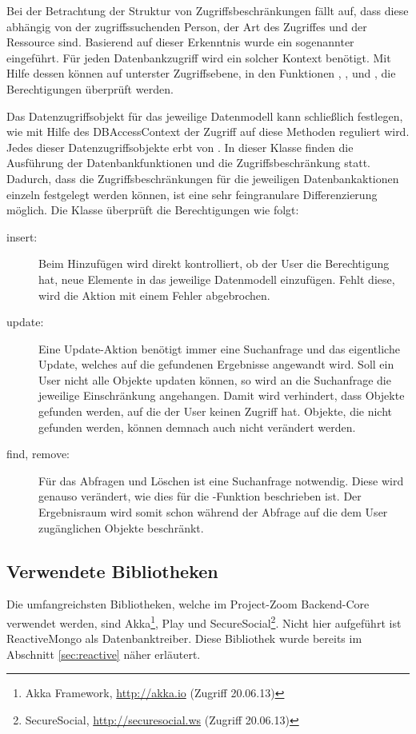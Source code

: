 Bei der Betrachtung der Struktur von Zugriffsbeschränkungen fällt auf, dass diese abhängig von der zugriffssuchenden Person, der Art des Zugriffes und der \gls{Ressource} sind. Basierend auf dieser Erkenntnis wurde ein sogenannter  eingeführt. Für jeden Datenbankzugriff wird ein solcher Kontext benötigt. Mit Hilfe dessen können auf unterster Zugriffsebene, in den Funktionen , ,  und , die Berechtigungen überprüft werden.

Das Datenzugriffsobjekt für das jeweilige Datenmodell kann schließlich festlegen, wie mit Hilfe des DBAccessContext der Zugriff auf diese Methoden reguliert wird. Jedes dieser Datenzugriffsobjekte erbt von . In dieser Klasse finden die Ausführung der Datenbankfunktionen und die Zugriffsbeschränkung statt. Dadurch, dass die Zugriffsbeschränkungen für die jeweiligen Datenbankaktionen einzeln festgelegt werden können, ist eine sehr feingranulare Differenzierung möglich.
\newpage
Die Klasse  überprüft die Berechtigungen wie folgt:
\begin{description}
\item[insert:] Beim Hinzufügen wird direkt kontrolliert, ob der User die Berechtigung hat, neue Elemente in das jeweilige Datenmodell einzufügen. Fehlt diese, wird die Aktion mit einem Fehler abgebrochen.
\item[update:] Eine Update-Aktion benötigt immer eine Suchanfrage und das eigentliche Update, welches auf die gefundenen Ergebnisse angewandt wird. Soll ein User nicht alle Objekte updaten können, so wird an die Suchanfrage die jeweilige Einschränkung angehangen. Damit wird verhindert, dass Objekte gefunden werden, auf die der User keinen Zugriff hat. Objekte, die nicht gefunden werden, können demnach auch nicht verändert werden.
\item[find, remove:] Für das Abfragen und Löschen ist eine Suchanfrage notwendig. Diese wird genauso verändert, wie dies für die -Funktion beschrieben ist. Der Ergebnisraum wird somit schon während der Abfrage auf die dem User zugänglichen Objekte beschränkt.
\end{description}

\subsection{Verwendete Bibliotheken}
Die umfangreichsten Bibliotheken, welche im Project-Zoom \gls{Backend}-Core verwendet werden, sind Akka\footnote{Akka \gls{Framework}, \url{http://akka.io} (Zugriff 20.06.13)}, Play und SecureSocial\footnote{SecureSocial, \url{http://securesocial.ws} (Zugriff 20.06.13)}. Nicht hier aufgeführt ist ReactiveMongo als Datenbanktreiber. Diese Bibliothek wurde bereits im Abschnitt \ref{sec:reactive} näher erläutert. 

